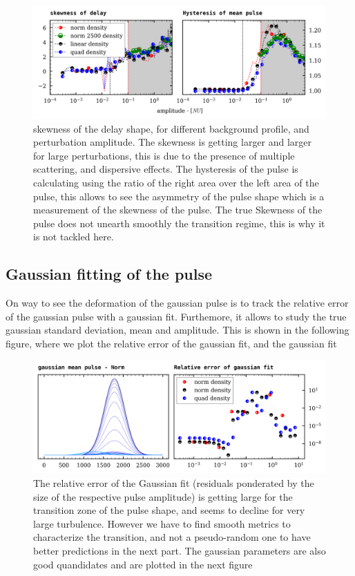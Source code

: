 \documentclass[11pt,a4paper]{report}
\begin{document}
\begin{figure}[H]
    \centering
    \includegraphics[width=1\linewidth]{./figures/skew_Hyst.png}
    \caption{skewness of the delay shape, for different background profile, and perturbation amplitude. The skewness is getting larger and larger for large perturbations, this is due to the presence of multiple scattering, and dispersive effects. The hysteresis of the pulse is calculating using the ratio of the right area over the left area of the pulse, this allows to see the asymmetry of the pulse shape which is a measurement of the skewness of the pulse.
        The true Skewness of the pulse does not unearth smoothly the transition regime, this is why it is not tackled here. }
    \label{}
\end{figure}

\begin{multicols}{2}
    \subsection{Gaussian fitting of the pulse}
    On way to see the deformation of the gaussian pulse is to track the relative error of the gaussian pulse with a gaussian fit. Furthemore, it allows to study the true gaussian standard deviation, mean and amplitude.
    This is shown in the following figure, where we plot the relative error of the gaussian fit, and the gaussian fit
\end{multicols}
\begin{figure}[H]
    \centering
    \includegraphics[width=1\linewidth]{./figures/gaussian_fit.png}
    \caption{The relative error of the Gaussian fit (residuals ponderated by the size of the respective pulse amplitude) is getting large for the transition zone of the pulse shape, and seems to decline for very large turbulence. However we have to find smooth metrics to characterize the transition, and not a pseudo-random one to have better predictions in the next part.
        The gaussian parameters are also good quandidates and are plotted in the next figure }
    \label{}
\end{figure}
\end{document}
